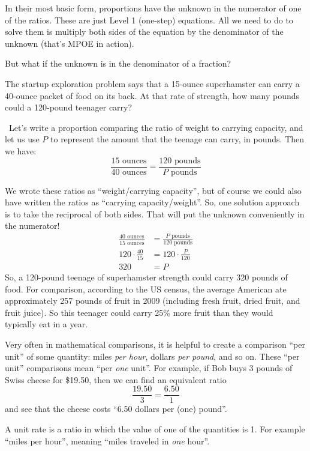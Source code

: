 In their most basic form, proportions have the unknown in the numerator of one of the ratios. These are just Level 1 (one-step) equations. All we need to do to solve them is multiply both sides of the equation by the denominator of the unknown (that's MPOE in action).

But what if the unknown is in the denominator of a fraction?

\begin{boxedex}
The startup exploration problem says that a 15-ounce superhamster can carry a 40-ounce packet of food on its back. At that rate of strength, how many pounds could a 120-pound teenager carry?

\exsoln\ Let's write a proportion comparing the ratio of weight to carrying capacity, and let us use $P$ to represent the amount that the teenage can carry, in pounds. Then we have: \[\frac{15 \text{ ounces}}{40 \text{ ounces}} = \frac{120 \text{ pounds}}{P \text{ pounds}}\]

We wrote these ratios as ``weight/carrying capacity'', but of course we could also  have written the ratios as ``carrying capacity/weight''. So, one solution approach is to take the reciprocal of both sides. That will put the unknown conveniently in the numerator!
\[\begin{aligned}
\frac{40 \text{ ounces}}{15 \text{ ounces}} &= \frac{P \text{ pounds}}{120 \text{ pounds}}
\\[2ex]
120\cdot\frac{40}{15} &= 120\cdot\frac{P}{120}
\\[2ex]
320 &= P
\end{aligned}\]
So, a 120-pound teenage of superhamster strength could carry 320 pounds of food. For comparison, according to the US census, the average American ate approximately 257 pounds of fruit in 2009 (including fresh fruit, dried fruit, and fruit juice). So this teenager could carry 25\% more fruit than they would typically eat in a year.
\end{boxedex}

Very often in mathematical comparisons, it is helpful to create a comparison ``per unit'' of some quantity: miles \textit{per hour}, dollars \textit{per pound}, and so on. These ``per unit'' comparisons mean ``per \textit{one} unit''. For example, if Bob buys 3 pounds of Swiss cheese for \$19.50, then we can find an equivalent ratio \[\frac{19.50}{3} = \frac{6.50}{1}\] and see that the cheese costs ``6.50 dollars per (one) pound''.

\begin{boxeddef}
A \gls{unit rate} is a ratio in which the value of one of the quantities is 1. For example ``miles per hour'', meaning ``miles traveled in \textit{one} hour''.
\end{boxeddef}

